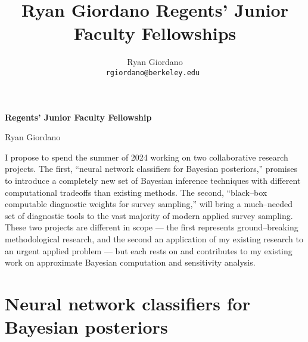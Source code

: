
\usepackage{enumitem}

\usepackage{geometry}
\geometry{top=1.0in}
\geometry{left=1.1in}
\geometry{right=1.1in}

\title{Ryan Giordano Regents’ Junior Faculty Fellowships}

\author{
  Ryan Giordano \\ \texttt{rgiordano@berkeley.edu }
}



\begin{minipage}[t]{0.7\textwidth}
\hspace{-2em} %
{\bf \LARGE Regents’ Junior Faculty Fellowship}\\
\end{minipage}
\begin{minipage}[t]{0.3\textwidth}
        {\LARGE Ryan Giordano}
\end{minipage}

I propose to spend the summer of 2024 working on two collaborative research
projects.  The first, ``neural network classifiers for Bayesian posteriors,''
promises to introduce a completely new set of Bayesian inference techniques with
different computational tradeoffs than existing methods. The second,
``black--box computable diagnostic weights for survey sampling,'' will bring a
much--needed set of diagnostic tools to the vast majority of modern applied
survey sampling.  These two projects are different in scope --- the first
represents ground--breaking methodological research, and the second an
application of my existing research to an urgent applied problem --- but each
rests on and contributes to my existing work on approximate Bayesian computation
and sensitivity analysis. 





\section*{Neural network classifiers for Bayesian posteriors}

